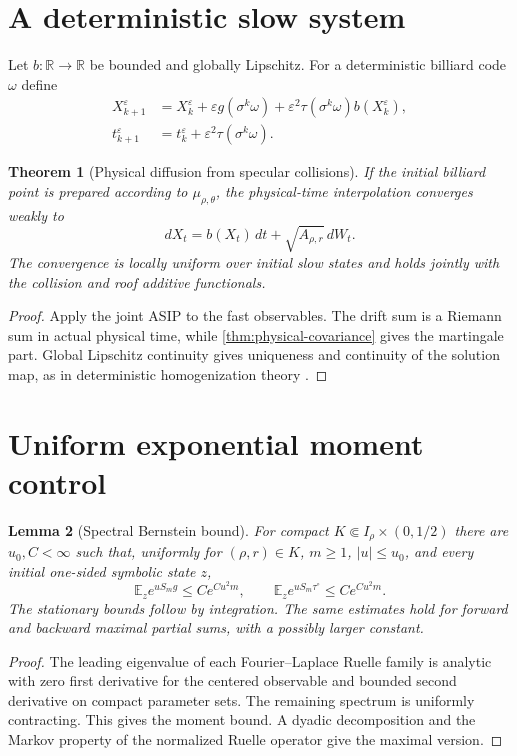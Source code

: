 \documentclass[11pt,reqno]{amsart}
\newtheorem{theorem}{Theorem}[section]
\newtheorem{lemma}[theorem]{Lemma}
\theoremstyle{definition}
\theoremstyle{remark}
\newcommand{\E}{\mathbb E}
\newcommand{\R}{\mathbb R}
\newcommand{\abs}[1]{\left\lvert #1\right\rvert}
\begin{document}
\section{A deterministic slow system}\label{sec:slow}
Let $b:\R\to\R$ be bounded and globally Lipschitz.  For a deterministic
billiard code $\omega$ define
\begin{align*}
 X_{k+1}^\varepsilon
 &=X_k^\varepsilon
 +\varepsilon g(\sigma^k\omega)
 +\varepsilon^2\tau(\sigma^k\omega)b(X_k^\varepsilon),\\
 t_{k+1}^\varepsilon
 &=t_k^\varepsilon+\varepsilon^2\tau(\sigma^k\omega).
\end{align*}

\begin{theorem}[Physical diffusion from specular collisions]\label{thm:SDE}
If the initial billiard point is prepared according to $\mu_{\rho,\theta}$,
the physical-time interpolation converges weakly to
\[
 dX_t=b(X_t)\,dt+\sqrt{A_{\rho,r}}\,dW_t.
\]
The convergence is locally uniform over initial slow states and holds jointly
with the collision and roof additive functionals.
\end{theorem}
\begin{proof}
Apply the joint ASIP to the fast observables.  The drift sum is a Riemann sum in
actual physical time, while \cref{thm:physical-covariance} gives the martingale
part.  Global Lipschitz continuity gives uniqueness and continuity of the
solution map, as in deterministic homogenization theory
\cite{KellyMelbourne2016}.
\end{proof}

\section{Uniform exponential moment control}\label{sec:mgf}
\begin{lemma}[Spectral Bernstein bound]\label{lem:bernstein}
For compact $K\Subset I_\rho\times(0,1/2)$ there are $u_0,C<\infty$ such that,
uniformly for $(\rho,r)\in K$, $m\ge1$, $\abs u\le u_0$, and every initial one-sided symbolic state $z$,
\[
 \E_z e^{uS_mg}\le C e^{C u^2m},
 \qquad
 \E_z e^{uS_m\tau^\circ}\le C e^{C u^2m}.
\]
The stationary bounds follow by integration.  The same estimates hold for
forward and backward maximal partial sums, with a possibly larger constant.
\end{lemma}
\begin{proof}
The leading eigenvalue of each Fourier--Laplace Ruelle family is analytic with
zero first derivative for the centered observable and bounded second
derivative on compact parameter sets.  The remaining spectrum is uniformly
contracting.  This gives the moment bound.  A dyadic decomposition and the
Markov property of the normalized Ruelle operator give the maximal version.
\end{proof}
\end{document}
